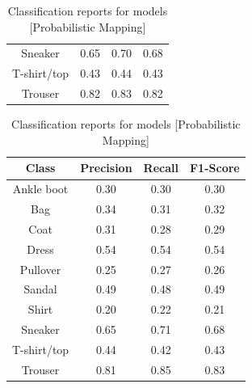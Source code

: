 \begin{table}[H]
\begin{minipage}{0.32\textwidth}
\begin{adjustbox}{max width=1\textwidth}
\begin{tabular}{|c|c|c|c|}
            Sneaker & 0.65 & 0.70 & 0.68 \\ 
            T-shirt/top & 0.43 & 0.44 & 0.43 \\ 
            Trouser & 0.82 & 0.83 & 0.82 \\ \hline
            \end{tabular}
        \end{adjustbox}
    \end{minipage}
    \hfill
    \begin{minipage}{0.32\textwidth}
        \centering
        \begin{adjustbox}{max width=1\textwidth}
            \begin{tabular}{|c|c|c|c|}
                \hline
                \textbf{Class} & \textbf{Precision} & \textbf{Recall} & \textbf{F1-Score} \\ \hline
                Ankle boot & 0.30 & 0.30 & 0.30 \\ 
                Bag & 0.34 & 0.31 & 0.32 \\ 
                Coat & 0.31 & 0.28 & 0.29 \\ 
                Dress & 0.54 & 0.54 & 0.54 \\ 
                Pullover & 0.25 & 0.27 & 0.26 \\ 
                Sandal & 0.49 & 0.48 & 0.49 \\ 
                Shirt & 0.20 & 0.22 & 0.21 \\ 
                Sneaker & 0.65 & 0.71 & 0.68 \\ 
                T-shirt/top & 0.44 & 0.42 & 0.43 \\ 
                Trouser & 0.81 & 0.85 & 0.83 \\ \hline
            \end{tabular}
        \end{adjustbox}
    \end{minipage}
    \caption{\footnotesize Classification reports for models [Probabilistic Mapping]}
    \label{tab:ClassificationReport_Probabilistic}
\end{table}

